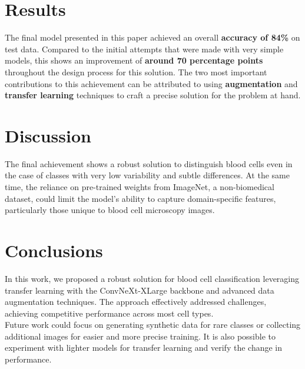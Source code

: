 \documentclass[11pt]{article}
\begin{document}
\begin{multicols}{2}
        \section{Results}
		The final model presented in this paper achieved an overall \textbf{accuracy of 84\%} on test data. Compared to the initial attempts that were made with very simple models, this shows an improvement of \textbf{around 70 percentage points} throughout the design process for this solution. The two most important contributions to this achievement can be attributed to using \textbf{augmentation} and \textbf{transfer learning} techniques to craft a precise solution for the problem at hand.
        
        \section{Discussion}
        The final achievement shows a robust solution to distinguish blood cells even in the case of classes with very low variability and subtle differences. At the same time, the reliance on pre-trained weights from ImageNet, a non-biomedical dataset, could limit the model's ability to capture domain-specific features, particularly those unique to blood cell microscopy images. 

        \section{Conclusions}
	In this work, we proposed a robust solution for blood cell classification leveraging transfer learning with the ConvNeXt-XLarge backbone and advanced data augmentation techniques. The approach effectively addressed challenges, achieving competitive performance across most cell types. \\
Future work could focus on generating synthetic data for rare classes or collecting additional images for easier and more precise training. It is also possible to experiment with lighter models for transfer learning and verify the change in performance.
\cite{mixup}
        


        
        
    
    \end{multicols}
\end{document}
